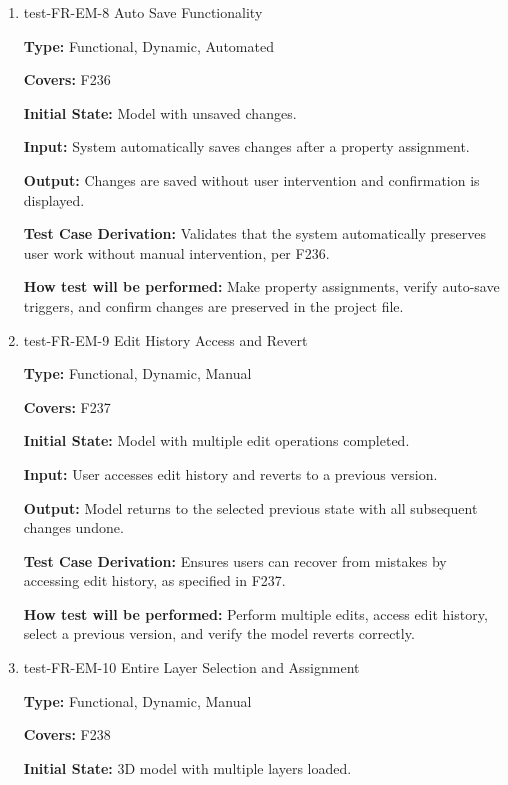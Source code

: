 \documentclass[12pt, titlepage]{article}
\begin{document}
\begin{enumerate}
\item{test-FR-EM-8 Auto Save Functionality\\}
\label{sec:t-em-8}

\textbf{Type:} Functional, Dynamic, Automated

\textbf{Covers:} F236
					
\textbf{Initial State:} Model with unsaved changes.
					
\textbf{Input:} System automatically saves changes after a property assignment.
					
\textbf{Output:} Changes are saved without user intervention and confirmation is displayed.

\textbf{Test Case Derivation:} Validates that the system automatically preserves user work without manual intervention, per F236.
					
\textbf{How test will be performed:} Make property assignments, verify auto-save triggers, and confirm changes are preserved in the project file.

\item{test-FR-EM-9 Edit History Access and Revert\\}
\label{sec:t-em-9}

\textbf{Type:} Functional, Dynamic, Manual

\textbf{Covers:} F237
					
\textbf{Initial State:} Model with multiple edit operations completed.
					
\textbf{Input:} User accesses edit history and reverts to a previous version.
					
\textbf{Output:} Model returns to the selected previous state with all subsequent changes undone.

\textbf{Test Case Derivation:} Ensures users can recover from mistakes by accessing edit history, as specified in F237.
					
\textbf{How test will be performed:} Perform multiple edits, access edit history, select a previous version, and verify the model reverts correctly.

\item{test-FR-EM-10 Entire Layer Selection and Assignment\\}
\label{sec:t-em-10}

\textbf{Type:} Functional, Dynamic, Manual

\textbf{Covers:} F238
					
\textbf{Initial State:} 3D model with multiple layers loaded.
					

\end{enumerate}
\end{document}
